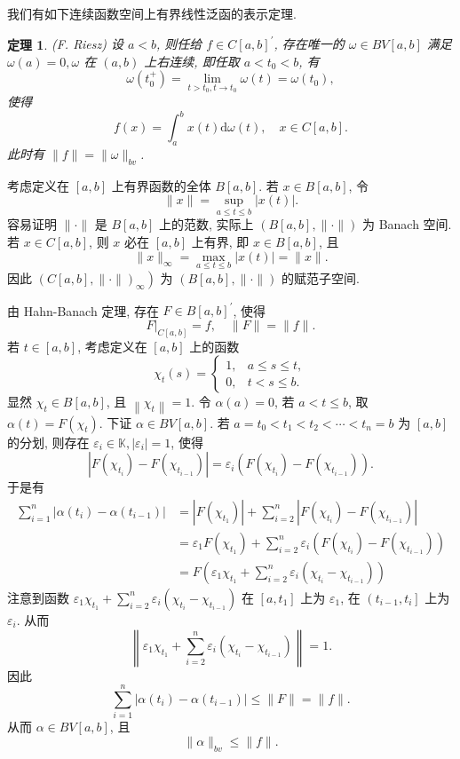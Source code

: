 \documentclass[openany]{ctexbook}
\makeatletter
\theoremstyle{kaiti}
\newtheorem{theorem}{定理}[section]
\theoremstyle{normal}
\renewenvironment{proof}[1][\proofname]{\par
    \pushQED{\qed}%
    \normalfont \topsep6\p@\@plus6\p@\relax
    \trivlist
    \item\relax
    {\heiti #1}\hspace{2\labelsep}\ignorespaces
  }{%
    \popQED\endtrivlist\@endpefalse
  }
\makeatother
\begin{document}
我们有如下连续函数空间上有界线性泛函的表示定理.

\begin{theorem}
(F. Riesz) 设 $a<b$, 则任给 $f \in C[a, b]^{\prime}$, 存在唯一的 $\omega \in B V[a, b]$ 满足 $\omega(a)=0, \omega$ 在 $(a, b)$ 上右连续, 即任取 $a<t_0<b$, 有
$$
\omega\left(t_0^{+}\right)=\lim_{t>t_0, t \rightarrow t_0} \omega(t)=\omega\left(t_0\right),
$$
使得
$$
f(x)=\int_{a}^{b} x(t) \mathrm{d} \omega(t), \quad x \in C[a, b].
$$
此时有 $\|f\|=\|\omega\|_{b v}$.
\end{theorem}

\begin{proof}
考虑定义在 $[a, b]$ 上有界函数的全体 $B[a, b]$. 若 $x \in B[a, b]$, 令
$$
\|x\|=\sup_{a \leqslant t \leqslant b}|x(t)|.
$$
容易证明 $\|\cdot\|$ 是 $B[a, b]$ 上的范数, 实际上 $(B[a, b],\|\cdot\|)$ 为 Banach 空间. 若 $x \in C[a, b]$, 则 $x$ 必在 $[a, b]$ 上有界, 即 $x \in B[a, b]$, 且
$$
\|x\|_{\infty}=\max_{a \leqslant t \leqslant b}|x(t)|=\|x\|.
$$
因此 $\left.(C[a, b],\|\cdot\|)_{\infty}\right)$ 为 $(B[a, b],\|\cdot\|)$ 的赋范子空间.

由 Hahn-Banach 定理, 存在 $F \in B[a, b]^{\prime}$, 使得
$$
\left.F\right|_{C[a, b]}=f, \quad\|F\|=\|f\|.
$$
若 $t \in[a, b]$, 考虑定义在 $[a, b]$ 上的函数
$$
\chi_{t}(s)= \begin{cases}1, & a \leqslant s \leqslant t, \\ 0, & t<s \leqslant b.\end{cases}
$$
显然 $\chi_{t} \in B[a, b]$, 且 $\left\|\chi_{t}\right\|=1$. 令 $\alpha(a)=0$, 若 $a<t \leqslant b$, 取 $\alpha(t)=F\left(\chi_{t}\right)$. 下证 $\alpha \in B V[a, b]$. 若 $a=t_0<t_1<t_2<\cdots<t_n=b$ 为 $[a, b]$ 的分划, 则存在 $\varepsilon_{i} \in \mathbb{K},\left|\varepsilon_{i}\right|=1$, 使得
$$
\left|F\left(\chi_{t_{i}}\right)-F\left(\chi_{t_{i-1}}\right)\right|=\varepsilon_{i}\left(F\left(\chi_{t_{i}}\right)-F\left(\chi_{t_{i-1}}\right)\right).
$$
于是有
$$
\begin{aligned}
\sum_{i=1}^n\left|\alpha\left(t_{i}\right)-\alpha\left(t_{i-1}\right)\right| &=\left|F\left(\chi_{t_1}\right)\right|+\sum_{i=2}^n\left|F\left(\chi_{t_{i}}\right)-F\left(\chi_{t_{i-1}}\right)\right| \\
&=\varepsilon_1 F\left(\chi_{t_1}\right)+\sum_{i=2}^n \varepsilon_{i}\left(F\left(\chi_{t_{i}}\right)-F\left(\chi_{t_{i-1}}\right)\right) \\
&=F\left(\varepsilon_1 \chi_{t_1}+\sum_{i=2}^n \varepsilon_{i}\left(\chi_{t_{i}}-\chi_{t_{i-1}}\right)\right)
\end{aligned}
$$
注意到函数 $\varepsilon_1 \chi_{t_1}+\sum_{i=2}^n \varepsilon_{i}\left(\chi_{t_{i}}-\chi_{t_{i-1}}\right)$ 在 $\left[a, t_1\right]$ 上为 $\varepsilon_1$, 在 $\left(t_{i-1}, t_{i}\right]$ 上为 $\varepsilon_{i}$. 从而
$$
\left\|\varepsilon_1 \chi_{t_1}+\sum_{i=2}^n \varepsilon_{i}\left(\chi_{t_{i}}-\chi_{t_{i-1}}\right)\right\|=1.
$$
因此
$$
\sum_{i=1}^n\left|\alpha\left(t_{i}\right)-\alpha\left(t_{i-1}\right)\right| \leqslant\|F\|=\|f\|.
$$
从而 $\alpha \in B V[a, b]$, 且
\begin{equation}
  \|\alpha\|_{b v} \leqslant\|f\|.
\end{equation}


\end{proof}
\end{document}
